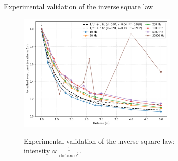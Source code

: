 \documentclass{beamer}
\begin{document}
\begin{frame}{Experimental validation of the inverse square law}

    \begin{figure}
        \centering
        \includegraphics[width=0.70\textwidth]{../fig/pgfplot/build/inv_square.pdf}
        \label{fig:fit1}
        \caption{Experimental validation of the inverse square law: \scriptsize{$\text{intensity} \propto \frac{1}{\text{distance}^2}$}.}
    \end{figure}


\end{frame}

\end{document}
